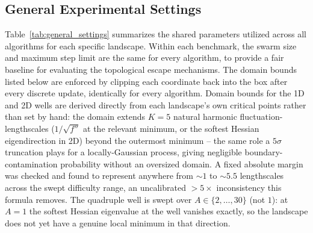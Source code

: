\documentclass{article} %
\theoremstyle{plain}
\theoremstyle{definition}
\theoremstyle{remark}
\begin{document}
\subsection{General Experimental Settings}
Table~\ref{tab:general_settings} summarizes the shared parameters utilized across all algorithms for each specific landscape. Within each benchmark, the swarm size and maximum step limit are the same for every algorithm, to provide a fair baseline for evaluating the topological escape mechanisms. The domain bounds listed below are enforced by clipping each coordinate back into the box after every discrete update, identically for every algorithm. Domain bounds for the 1D and 2D wells are derived directly from each landscape's own critical points rather than set by hand: the domain extends $K=5$ natural harmonic fluctuation-lengthscales ($1/\sqrt{f''}$ at the relevant minimum, or the softest Hessian eigendirection in 2D) beyond the outermost minimum -- the same role a $5\sigma$ truncation plays for a locally-Gaussian process, giving negligible boundary-contamination probability without an oversized domain. A fixed absolute margin was checked and found to represent anywhere from $\sim\!1$ to $\sim\!5.5$ lengthscales across the swept difficulty range, an uncalibrated $>\!5\times$ inconsistency this formula removes. The quadruple well is swept over $A\in\{2,\dots,30\}$ (not $1$): at $A=1$ the softest Hessian eigenvalue at the well vanishes exactly, so the landscape does not yet have a genuine local minimum in that direction.
\end{document}
